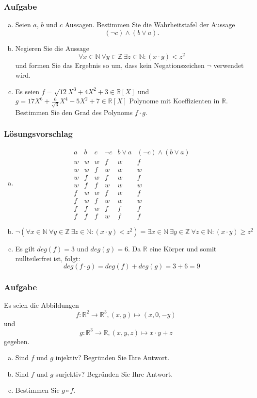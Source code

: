 \documentclass[a4paper,11pt]{scrartcl}
\newcounter{auf}
\newcommand{\Aufgabe}%
        {\addtocounter{auf}{1} \subsubsection*{\rmfamily  Aufgabe \theauf \hspace{1em}} }
\newcommand{\N}{\mathbb{N}}
\newcommand{\RR}{\mathbb{R}}
\newcommand{\Z}{\mathbb{Z}}
\begin{document}
\Aufgabe

\begin{enumerate}[a)]

\item Seien $a$, $b$ und $c$  Aussagen. 
Bestimmen Sie die Wahrheitstafel der Aussage
$$
	(\neg c) \land (b \lor a).
$$
\item  Negieren Sie die Aussage 
$$
\forall x \in \N\ \forall y \in \Z\ \exists z \in \N: (x\cdot y) < z^2
$$
und formen Sie das Ergebnis so um, dass kein Negationszeichen $\neg$ verwendet wird.
\item Es seien $f=\sqrt{12}X^3+4X^2+3 \in \RR[X]$ und $g=17X^6+\frac{6}{\sqrt{3}}X^4+5X^2+7 \in \RR[X]$ Polynome mit Koeffizienten in $\RR$. Bestimmen Sie den Grad des Polynoms $f\cdot g$.
\end{enumerate}
%
%
\subsubsection*{Lösungsvorschlag}
\begin{enumerate}[a)]

\item $$\begin{array}{c|c|c||c|c||c}
a&b&c&\neg c&b\lor a&(\neg c)\land(b\lor a)\\ \hline
w&w&w&f&w&f\\
w&w&f&w&w&w\\
w&f&w&f&w&f\\
w&f&f&w&w&w\\
f&w&w&f&w&f\\
f&w&f&w&w&w\\
f&f&w&f&f&f\\
f&f&f&w&f&f
\end{array}$$
\item $\neg(\forall x \in \N\ \forall y \in \Z\ \exists z \in \N: (x\cdot y) < z^2) = \exists x \in \N\ \exists y \in \Z\ \forall z \in \N: (x\cdot y) \ge z^2$ 
\item Es gilt $deg(f)=3$ und $deg(g)=6$. Da $\RR$ eine Körper und somit nullteilerfrei ist, folgt: 
$$
deg(f\cdot g)=deg(f)+deg(g)=3+6=9
$$
\end{enumerate}
\newpage
\Aufgabe
Es seien die Abbildungen $$f:\RR^2 \to \RR^3, (x,y) \mapsto (x, 0, -y)$$ und $$g: \RR^3 \to \RR, (x,y,z) \mapsto x\cdot y+z$$ gegeben. 
\begin{enumerate}[a)]
\item Sind $f$ und $g$ injektiv? Begründen Sie Ihre Antwort.
\item Sind $f$ und $g$ surjektiv? Begründen Sie Ihre Antwort.
\item Bestimmen Sie $g \circ f$. 
\end{enumerate}
%
%
\end{document}
